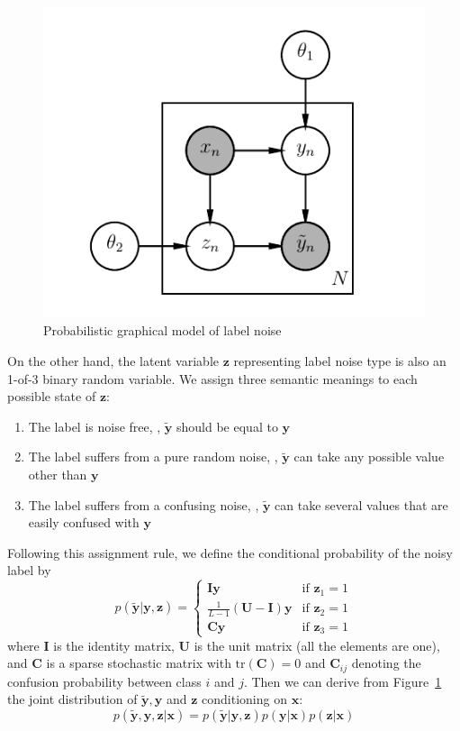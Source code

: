 \documentclass[10pt,twocolumn,letterpaper]{article}
\def\vec{\mathbf}
\def\mat{\mathbf}
\begin{document}
\begin{figure}[t]
\begin{center}
\includegraphics[width=0.6\linewidth]{figure/pgm.pdf}
\end{center}
\caption{Probabilistic graphical model of label noise}
\label{fig:noise_pgm}
\end{figure}

On the other hand, the latent variable $\vec{z}$ representing label noise type is also an 1-of-3 binary random variable. We assign three semantic meanings to each possible state of $\vec{z}$:
\begin{enumerate}
    \item The label is noise free, \ie, $\tilde{\vec{y}}$ should be equal to $\vec{y}$
    \item The label suffers from a pure random noise, \ie, $\tilde{\vec{y}}$ can take any possible value other than $\vec{y}$
    \item The label suffers from a confusing noise, \ie, $\tilde{\vec{y}}$ can take several values that are easily confused with $\vec{y}$
\end{enumerate}

Following this assignment rule, we define the conditional probability of the noisy label by
\begin{equation} \label{eq:likelihood}
    p(\tilde{\vec{y}}|\vec{y},\vec{z}) = \begin{cases}
        \mat{I}\vec{y} & \text{if } \vec{z}_1 = 1 \\
        \frac{1}{L-1}(\mat{U} - \mat{I})\vec{y} & \text{if } \vec{z}_2 = 1 \\
        \mat{C}\vec{y} & \text{if } \vec{z}_3 = 1
    \end{cases}
\end{equation}
where $\mat{I}$ is the identity matrix, $\mat{U}$ is the unit matrix (all the elements are one), and $\mat{C}$ is a sparse stochastic matrix with $\mathrm{tr}(\mat{C})=0$ and $\mat{C}_{ij}$ denoting the confusion probability between class $i$ and $j$. Then we can derive from Figure~\ref{fig:noise_pgm} the joint distribution of $\tilde{\vec{y}}, \vec{y}$ and $\vec{z}$ conditioning on $\vec{x}$:
\begin{equation} \label{eq:joint_distribution}
  p(\tilde{\vec{y}}, \vec{y}, \vec{z} | \vec{x}) = p(\tilde{\vec{y}} | \vec{y}, \vec{z}) p(\vec{y} | \vec{x}) p(\vec{z} | \vec{x})
\end{equation}
\end{document}
